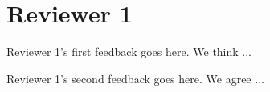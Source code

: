 \section*{Reviewer 1}

\begin{feedback}[1]
Reviewer 1's first feedback goes here.
%
\response
%
We think ...
\end{feedback}

\begin{feedback}[2]
Reviewer 1's second feedback goes here.
%
\response
%
We agree ...
\end{feedback}
